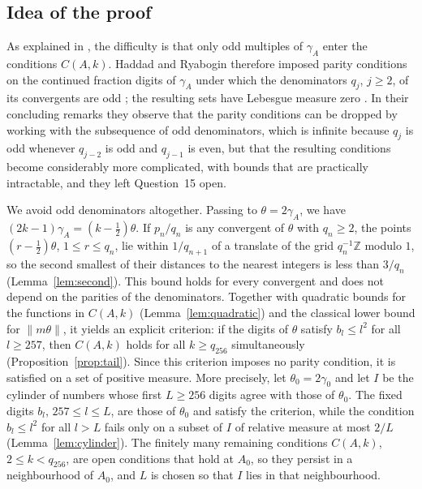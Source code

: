 \documentclass{amsart}
\theoremstyle{definition}
\theoremstyle{remark}
\numberwithin{equation}{section}
\newcommand{\Z}{\mathbb{Z}}
\newcommand{\norm}[1]{\lVert #1 \rVert}
\begin{document}
\subsection*{Idea of the proof}
As explained in \cite[Section~4]{HR}, the difficulty is that only odd multiples of $\gamma_A$ enter the conditions $C(A,k)$. Haddad and Ryabogin therefore imposed parity conditions on the continued fraction digits of $\gamma_A$ under which the denominators $q_j$, $j\ge2$, of its convergents are odd \cite[Proposition~13 and Theorem~14]{HR}; the resulting sets have Lebesgue measure zero \cite[p.~19]{HR}. In their concluding remarks \cite[Section~5]{HR} they observe that the parity conditions can be dropped by working with the subsequence of odd denominators, which is infinite because $q_j$ is odd whenever $q_{j-2}$ is odd and $q_{j-1}$ is even, but that the resulting conditions become considerably more complicated, with bounds that are practically intractable, and they left Question~15 open.

We avoid odd denominators altogether. Passing to $\theta=2\gamma_A$, we have $(2k-1)\gamma_A=(k-\frac12)\theta$. If $p_n/q_n$ is any convergent of $\theta$ with $q_n\ge2$, the points $(r-\frac12)\theta$, $1\le r\le q_n$, lie within $1/q_{n+1}$ of a translate of the grid $q_n^{-1}\Z$ modulo $1$, so the second smallest of their distances to the nearest integers is less than $3/q_n$ (Lemma~\ref{lem:second}). This bound holds for every convergent and does not depend on the parities of the denominators. Together with quadratic bounds for the functions in $C(A,k)$ (Lemma~\ref{lem:quadratic}) and the classical lower bound for $\norm{m\theta}$, it yields an explicit criterion: if the digits of $\theta$ satisfy $b_l\le l^2$ for all $l\ge257$, then $C(A,k)$ holds for all $k\ge q_{256}$ simultaneously (Proposition~\ref{prop:tail}). Since this criterion imposes no parity condition, it is satisfied on a set of positive measure. More precisely, let $\theta_0=2\gamma_0$ and let $I$ be the cylinder of numbers whose first $L\ge256$ digits agree with those of $\theta_0$. The fixed digits $b_l$, $257\le l\le L$, are those of $\theta_0$ and satisfy the criterion, while the condition $b_l\le l^2$ for all $l>L$ fails only on a subset of $I$ of relative measure at most $2/L$ (Lemma~\ref{lem:cylinder}). The finitely many remaining conditions $C(A,k)$, $2\le k<q_{256}$, are open conditions that hold at $A_0$, so they persist in a neighbourhood of $A_0$, and $L$ is chosen so that $I$ lies in that neighbourhood.
\end{document}
